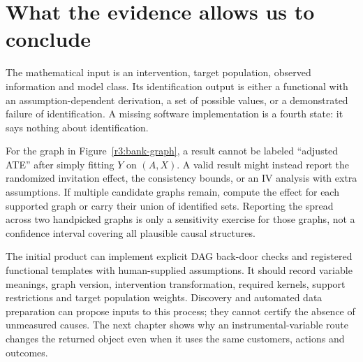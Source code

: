 \section{What the evidence allows us to conclude}
\label{r3:graph-contract}
The mathematical input is an intervention, target population, observed
information and model class. Its identification output is either a
functional with an assumption-dependent derivation, a set of possible
values, or a demonstrated failure of identification. A missing software
implementation is a fourth state: it says nothing about identification.

For the graph in Figure~\ref{r3:bank-graph}, a result cannot be labeled
``adjusted ATE'' after simply fitting $Y$ on $(A,X)$. A valid result might
instead report the randomized invitation effect, the consistency bounds,
or an IV analysis with extra assumptions. If multiple candidate graphs
remain, compute the effect for each supported graph or carry their union
of identified sets. Reporting the spread across two handpicked graphs is
only a sensitivity exercise for those graphs, not a confidence interval
covering all plausible causal structures.

The initial product can implement explicit DAG back-door checks and
registered functional templates with human-supplied assumptions. It should
record variable meanings, graph version, intervention transformation,
required kernels, support restrictions and target population weights.
Discovery and automated data preparation can propose inputs to this
process; they cannot certify the absence of unmeasured causes. The next
chapter shows why an instrumental-variable route changes the returned
object even when it uses the same customers, actions and outcomes.

